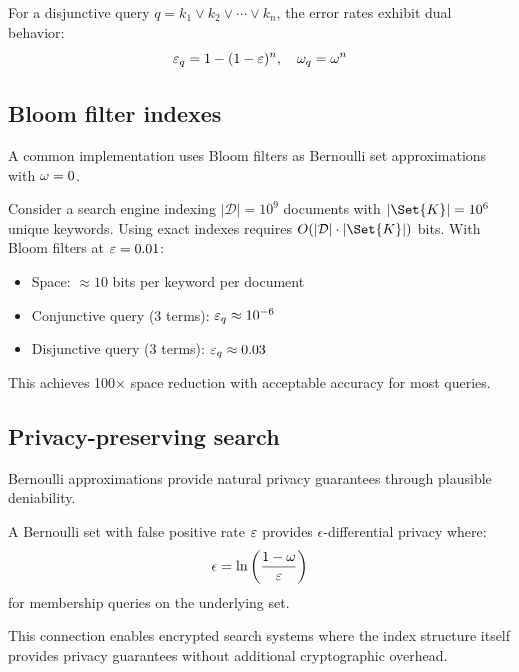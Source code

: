 \documentclass[ ../main.tex]{subfiles}
\begin{document}
\begin{theorem}
For a disjunctive query $q = k_1 \lor k_2 \lor \cdots \lor k_n$, the error rates exhibit dual behavior:
\begin{equation}
\varepsilon_q = 1 - (1-\varepsilon)^n, \quad \omega_q = \omega^n
\end{equation}
\end{theorem}

\subsection{Bloom filter indexes}

A common implementation uses Bloom filters as Bernoulli set approximations with $\omega = 0$.

\begin{example}
Consider a search engine indexing $|\mathcal{D}| = 10^9$ documents with $|\Set{K}| = 10^6$ unique keywords. Using exact indexes requires $O(|\mathcal{D}| \cdot |\Set{K}|)$ bits. With Bloom filters at $\varepsilon = 0.01$:
\begin{itemize}
\item Space: $\approx 10$ bits per keyword per document
\item Conjunctive query (3 terms): $\varepsilon_q \approx 10^{-6}$
\item Disjunctive query (3 terms): $\varepsilon_q \approx 0.03$
\end{itemize}
This achieves 100× space reduction with acceptable accuracy for most queries.
\end{example}

\subsection{Privacy-preserving search}

Bernoulli approximations provide natural privacy guarantees through plausible deniability.

\begin{theorem}
A Bernoulli set with false positive rate $\varepsilon$ provides $\epsilon$-differential privacy where:
\begin{equation}
\epsilon = \ln\left(\frac{1-\omega}{\varepsilon}\right)
\end{equation}
for membership queries on the underlying set.
\end{theorem}

This connection enables encrypted search systems where the index structure itself provides privacy guarantees without additional cryptographic overhead.
\end{document}
